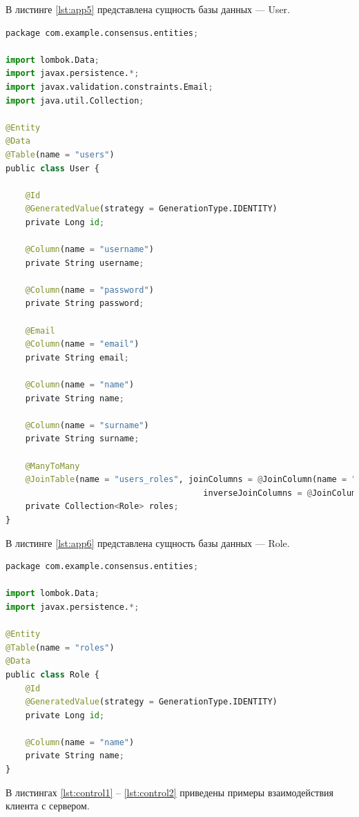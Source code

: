 В листинге \ref{lst:app5} представлена сущность базы данных --- User.

\begin{lstlisting}[label=lst:app5, caption=Сущность User, language=python]
package com.example.consensus.entities;

import lombok.Data;
import javax.persistence.*;
import javax.validation.constraints.Email;
import java.util.Collection;

@Entity
@Data
@Table(name = "users")
public class User {

	@Id
	@GeneratedValue(strategy = GenerationType.IDENTITY)
	private Long id;

	@Column(name = "username")
	private String username;

	@Column(name = "password")
	private String password;

	@Email
	@Column(name = "email")
	private String email;

	@Column(name = "name")
	private String name;

	@Column(name = "surname")
	private String surname;

	@ManyToMany
	@JoinTable(name = "users_roles", joinColumns = @JoinColumn(name = "user_id"),
										inverseJoinColumns = @JoinColumn(name = "role_id"))
	private Collection<Role> roles;
}
\end{lstlisting}

В листинге \ref{lst:app6} представлена сущность базы данных --- Role.

\begin{lstlisting}[label=lst:app6, caption=Сущность Role, language=python]
package com.example.consensus.entities;

import lombok.Data;
import javax.persistence.*;

@Entity
@Table(name = "roles")
@Data
public class Role {
	@Id
	@GeneratedValue(strategy = GenerationType.IDENTITY)
	private Long id;

	@Column(name = "name")
	private String name;
}	
\end{lstlisting}

В листингах \ref{lst:control1} -- \ref{lst:control2} приведены примеры взаимодействия клиента с сервером.

